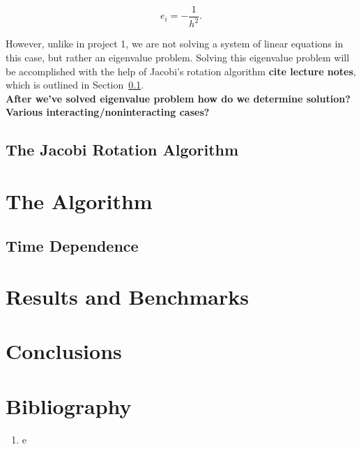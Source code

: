 \documentclass[12pt]{article}
\numberwithin{equation}{section}
\begin{document}
$$e_{i}=-\frac{1}{h^{2}}.$$

\noindent However, unlike in project 1, we are not solving a system of linear equations in this case, but rather an eigenvalue problem.  Solving this eigenvalue problem will be accomplished with the help of Jacobi's rotation algorithm \textbf{cite lecture notes}, which is outlined in Section~\ref{subsec:jacobi}.  
\\\indent \textbf{After we've solved eigenvalue problem how do we determine solution?  Various interacting/noninteracting cases?}

\subsection{The Jacobi Rotation Algorithm}
\label{subsec:jacobi}
\section{The Algorithm}
\label{sec:algorithm}

\subsection{Time Dependence}
\label{subsec:timedependence}

\section{Results and Benchmarks}
\label{sec:results}

\section{Conclusions}
\label{sec:conclusions}

\section{Bibliography}
\label{sec:bib}

\begin{enumerate}

\item e

\end{enumerate}
\end{document}
